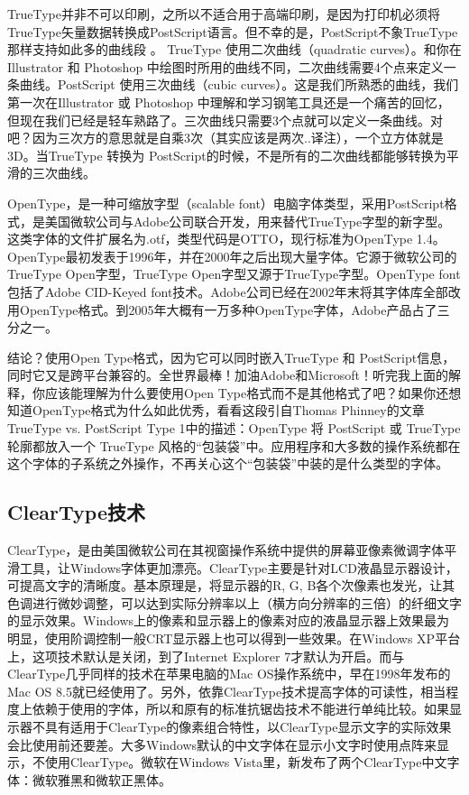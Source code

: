 TrueType并非不可以印刷，之所以不适合用于高端印刷，是因为打印机必须将TrueType矢量数据转换成PostScript语言。但不幸的是，PostScript不象TrueType那样支持如此多的曲线段 。
TrueType 使用二次曲线（quadratic curves）。和你在 Illustrator 和 Photoshop 中绘图时所用的曲线不同，二次曲线需要4个点来定义一条曲线。PostScript 使用三次曲线（cubic curves）。这是我们所熟悉的曲线，我们第一次在Illustrator 或 Photoshop 中理解和学习钢笔工具还是一个痛苦的回忆，但现在我们已经是轻车熟路了。三次曲线只需要3个点就可以定义一条曲线。对吧？因为三次方的意思就是自乘3次（其实应该是两次..译注），一个立方体就是3D。当TrueType 转换为 PostScript的时候，不是所有的二次曲线都能够转换为平滑的三次曲线。

OpenType，是一种可缩放字型（scalable font）电脑字体类型，采用PostScript格式，是美国微软公司与Adobe公司联合开发，用来替代TrueType字型的新字型。这类字体的文件扩展名为.otf，类型代码是OTTO，现行标准为OpenType 1.4。OpenType最初发表于1996年，并在2000年之后出现大量字体。它源于微软公司的TrueType Open字型，TrueType Open字型又源于TrueType字型。OpenType font包括了Adobe CID-Keyed font技术。Adobe公司已经在2002年末将其字体库全部改用OpenType格式。到2005年大概有一万多种OpenType字体，Adobe产品占了三分之一。

结论？使用Open Type格式，因为它可以同时嵌入TrueType 和 PostScript信息，同时它又是跨平台兼容的。全世界最棒！加油Adobe和Microsoft！听完我上面的解释，你应该能理解为什么要使用Open Type格式而不是其他格式了吧？如果你还想知道OpenType格式为什么如此优秀，看看这段引自Thomas Phinney的文章TrueType vs. PostScript Type 1中的描述：OpenType 将 PostScript 或 TrueType 轮廓都放入一个 TrueType 风格的“包装袋”中。应用程序和大多数的操作系统都在这个字体的子系统之外操作，不再关心这个“包装袋”中装的是什么类型的字体。

\subsection{ClearType技术}
ClearType，是由美国微软公司在其视窗操作系统中提供的屏幕亚像素微调字体平滑工具，让Windows字体更加漂亮。ClearType主要是针对LCD液晶显示器设计，可提高文字的清晰度。基本原理是，将显示器的R, G, B各个次像素也发光，让其色调进行微妙调整，可以达到实际分辨率以上（横方向分辨率的三倍）的纤细文字的显示效果。Windows上的像素和显示器上的像素对应的液晶显示器上效果最为明显，使用阶调控制一般CRT显示器上也可以得到一些效果。在Windows XP平台上，这项技术默认是关闭，到了Internet Explorer 7才默认为开启。而与ClearType几乎同样的技术在苹果电脑的Mac OS操作系统中，早在1998年发布的Mac OS 8.5就已经使用了。另外，依靠ClearType技术提高字体的可读性，相当程度上依赖于使用的字体，所以和原有的标准抗锯齿技术不能进行单纯比较。如果显示器不具有适用于ClearType的像素组合特性，以ClearType显示文字的实际效果会比使用前还要差。大多Windows默认的中文字体在显示小文字时使用点阵来显示，不使用ClearType。微软在Windows Vista里，新发布了两个ClearType中文字体：微软雅黑和微软正黑体。

